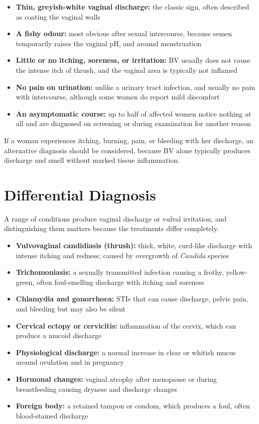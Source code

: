 \begin{itemize}
    \item \textbf{Thin, greyish-white vaginal discharge:} the classic sign, often described as coating the vaginal walls
    \item \textbf{A fishy odour:} most obvious after sexual intercourse, because semen temporarily raises the vaginal pH, and around menstruation
    \item \textbf{Little or no itching, soreness, or irritation:} BV usually does not cause the intense itch of thrush, and the vaginal area is typically not inflamed
    \item \textbf{No pain on urination:} unlike a urinary tract infection, and usually no pain with intercourse, although some women do report mild discomfort
    \item \textbf{An asymptomatic course:} up to half of affected women notice nothing at all and are diagnosed on screening or during examination for another reason
\end{itemize}

If a woman experiences itching, burning, pain, or bleeding with her discharge, an alternative diagnosis should be considered, because BV alone typically produces discharge and smell without marked tissue inflammation.

\section*{Differential Diagnosis}
A range of conditions produce vaginal discharge or vulval irritation, and distinguishing them matters because the treatments differ completely.

\begin{itemize}
    \item \textbf{Vulvovaginal candidiasis (thrush):} thick, white, curd-like discharge with intense itching and redness; caused by overgrowth of \textit{Candida} species
    \item \textbf{Trichomoniasis:} a sexually transmitted infection causing a frothy, yellow-green, often foul-smelling discharge with itching and soreness
    \item \textbf{Chlamydia and gonorrhoea:} STIs that can cause discharge, pelvic pain, and bleeding but may also be silent
    \item \textbf{Cervical ectopy or cervicitis:} inflammation of the cervix, which can produce a mucoid discharge
    \item \textbf{Physiological discharge:} a normal increase in clear or whitish mucus around ovulation and in pregnancy
    \item \textbf{Hormonal changes:} vaginal atrophy after menopause or during breastfeeding causing dryness and discharge changes
    \item \textbf{Foreign body:} a retained tampon or condom, which produces a foul, often blood-stained discharge
\end{itemize}

